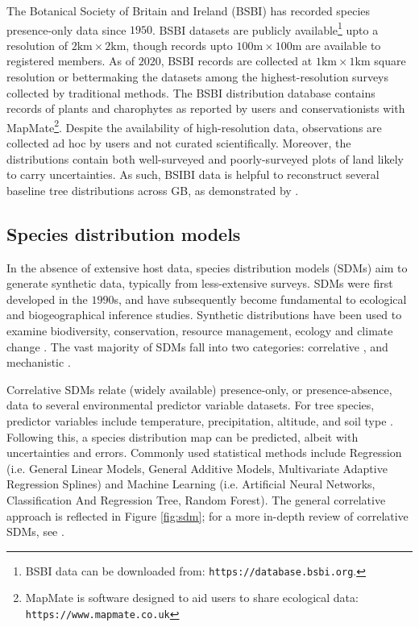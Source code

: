 The Botanical Society of Britain and Ireland (BSBI) has recorded species presence-only data since $1950$.
BSBI datasets are publicly available\footnote{BSBI data can be downloaded from: \nolinkurl{https://database.bsbi.org}.} upto a
resolution of $\mathrm{2 km \times 2km}$, though records upto $\mathrm{100 m \times 100 m}$ are available to registered members.
As of $2020$, BSBI records are collected at $\mathrm{1 km \times 1km}$ square resolution or better\textemdash making the datasets among the 
highest-resolution surveys collected by traditional methods. The BSBI distribution database contains records of plants and charophytes
as reported by users and conservationists with MapMate\footnote{MapMate is software designed to aid users to share ecological data: \nolinkurl{https://www.mapmate.co.uk}}.
Despite the availability of high-resolution data, observations are collected ad hoc by users and not curated scientifically.
Moreover, the distributions contain both well-surveyed and poorly-surveyed plots of land likely to carry uncertainties.
As such, BSIBI data is helpful to reconstruct several baseline tree distributions across GB, as demonstrated by \cite{hill.data}.

\subsection{Species distribution models}

In the absence of extensive host data, species distribution models (SDMs) aim to generate synthetic data, typically from less-extensive surveys.
SDMs were first developed in the $1990$s, and have subsequently become fundamental to ecological and biogeographical inference studies.
Synthetic distributions have been used to examine biodiversity, conservation, resource management, 
ecology and climate change \cite{franklin2013species, skov2016real, wittmann2016confronting, 10.3958/059.037.0110, zhang2019using}.
The vast majority of SDMs fall into two categories: correlative \cite{srivastava2019species}, and mechanistic \cite{shabani2016comparison}.

Correlative SDMs relate (widely available) presence-only, or presence-absence, data to several environmental predictor variable datasets.
For tree species, predictor variables include temperature, precipitation, altitude, and soil type \cite{ray2021multi, hill.data}.
Following this, a species distribution map can be predicted, albeit with  uncertainties and errors.
Commonly used statistical methods include Regression 
(i.e. General Linear Models, General Additive Models, Multivariate Adaptive Regression Splines) and Machine Learning
(i.e. Artificial Neural Networks, Classification And Regression Tree, Random Forest). 
The general correlative approach is reflected in Figure \ref{fig:sdm}; for a more in-depth review of correlative SDMs, see \cite{SDM_1}.


